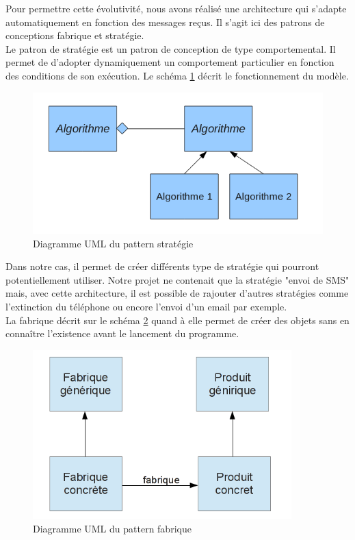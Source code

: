 Pour permettre cette évolutivité, nous avons réalisé une architecture qui s'adapte automatiquement en
fonction des messages reçus. Il s'agit ici des patrons de conceptions fabrique et stratégie. 
\\


Le patron de stratégie est un patron de conception de type comportemental. Il permet de d'adopter 
dynamiquement un comportement particulier en fonction des conditions de son exécution. Le schéma 
\ref{pattern_strategie} décrit le fonctionnement du modèle.

\begin{figure}[H]
	\center
	\includegraphics[width=12cm]{img/pattern_strategie.png}
	\caption{Diagramme UML du pattern stratégie}
	\label{pattern_strategie}
\end{figure}

Dans notre cas, il permet de créer différents type de stratégie qui pourront potentiellement utiliser. 
Notre projet ne contenait que la stratégie "envoi de SMS" mais, avec cette architecture, il est possible 
de rajouter d'autres stratégies comme l'extinction du téléphone ou encore l'envoi d'un email par exemple.
\\


La fabrique décrit sur le schéma \ref{fabrique} quand à elle permet de créer des objets sans en connaître l’existence avant le lancement du programme.

\begin{figure}[H]
	\center
	\includegraphics[width=10cm]{img/fabrique.png}
	\caption{Diagramme UML du pattern fabrique}
	\label{fabrique}
\end{figure}

